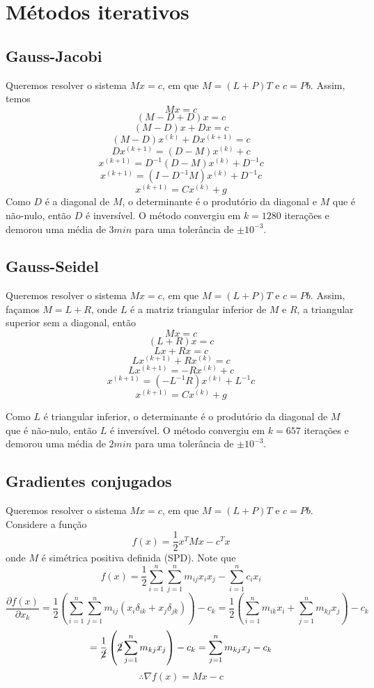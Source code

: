 \documentclass{article}
\begin{document}
    \newpage

    \section{Métodos iterativos}

    \subsection{Gauss-Jacobi}
    Queremos resolver o sistema $Mx = c$, em que $M = (L+P)T$ e $c = Pb$. Assim, temos
    \[Mx = c\]
    \[(M-D+D)x = c\]
    \[(M-D)x + Dx = c\]
    \[(M-D)x^{(k)} + Dx^{(k+1)} = c\]
    \[Dx^{(k+1)} = (D-M)x^{(k)} + c\]
    \[x^{(k+1)} = D^{-1}(D-M)x^{(k)}+D^{-1}c\]
    \[x^{(k+1)} = (I-D^{-1}M)x^{(k)}+D^{-1}c\]
    \[x^{(k+1)} = Cx^{(k)} + g\]
    Como $D$ é a diagonal de $M$, o determinante é o produtório da diagonal e $M$ que é não-nulo, então $D$ é inversível. O método convergiu em $k = 1280$ iterações e demorou uma média de $3min$ para uma tolerância de $\pm 10^{-3}$.

    \subsection{Gauss-Seidel}
    Queremos resolver o sistema $Mx = c$, em que $M = (L+P)T$ e $c = Pb$. Assim, façamos $M = L+R$, onde $L$ é a matriz triangular inferior de $M$ e $R$, a triangular superior sem a diagonal, então
    \[Mx = c\]
    \[(L+R)x = c\]
    \[Lx + Rx = c\]
    \[Lx^{(k+1)} + Rx^{(k)} = c\]
    \[Lx^{(k+1)} = - Rx^{(k)} + c\]
    \[x^{(k+1)} = (-L^{-1}R)x^{(k)} + L^{-1}c\]
    \[x^{(k+1)} = Cx^{(k)} + g\]

    Como $L$ é triangular inferior, o determinante é o produtório da diagonal de $M$ que é não-nulo, então $L$ é inversível. O método convergiu em $k = 657$ iterações e demorou uma média de $2 min$ para uma tolerância de $\pm 10^{-3}$.

    \subsection{Gradientes conjugados}
    Queremos resolver o sistema $Mx = c$, em que $M = (L+P)T$ e $c = Pb$. Considere a função
    \[f(x) = \frac{1}{2}x^TMx - c^Tx\]
    onde $M$ é simétrica positiva definida (SPD). Note que
    \[f(x) = \frac{1}{2} \sum_{i=1}^{n}\sum_{j=1}^{n} m_{ij} x_{i} x_{j} - \sum_{i=1}^{n} c_{i} x_{i}\]
    \[\frac{\partial f(x)}{\partial x_k} = \frac{1}{2} \left( \sum_{i=1}^{n}\sum_{j=1}^{n} m_{ij} (x_{i} \delta_{ik} + x_{j} \delta_{jk}) \right) - c_k = \frac{1}{2} \left( \sum_{i=1}^{n} m_{ik} x_{i} + \sum_{j=1}^{n} m_{kj} x_{j} \right) - c_k\]
    \[= \frac{1}{\cancel{2}} \left( \cancel{2} \sum_{j=1}^{n} m_{kj} x_{j} \right) - c_k = \sum_{j=1}^{n} m_{kj} x_{j} - c_k\]
    \[\therefore \nabla f(x) = Mx - c\]
\end{document}
